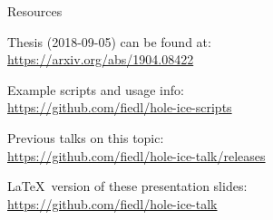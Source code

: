 
\begin{frame}{Resources}
  \begin{center}
    Thesis (2018-09-05) can be found at: \\ \vspace{0.2cm}
    \url{https://arxiv.org/abs/1904.08422}

    \vspace{1cm}

    Example scripts and usage info: \\ \vspace{0.2cm}
    \url{https://github.com/fiedl/hole-ice-scripts}

    \vspace{1cm}

    Previous talks on this topic: \\ \vspace{0.2cm}
    \url{https://github.com/fiedl/hole-ice-talk/releases}

    \vspace{1cm}

    \LaTeX\ version of these presentation slides: \\ \vspace{0.2cm}
    \url{https://github.com/fiedl/hole-ice-talk}
  \end{center}
\end{frame}

